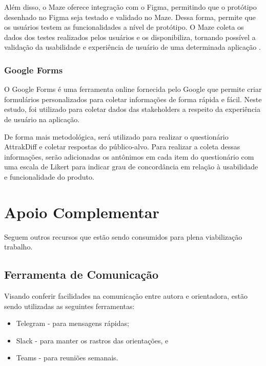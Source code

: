Além disso, o Maze oferece integração com o Figma, permitindo que o protótipo desenhado no Figma seja testado e validado no Maze. Dessa forma, permite que os usuários 
testem as funcionalidades a nível de protótipo. O Maze coleta os dados dos testes realizados pelos usuários e os disponibiliza, tornando possível a validação da usabilidade 
e experiência de usuário de uma determinada aplicação \cite{maze}.

\subsubsection{Google Forms}
\label{sec:Google Forms}
O Google Forms \cite{googleforms} é uma ferramenta online fornecida pelo Google que permite criar formulários personalizados para coletar informações de forma rápida e fácil. Neste estudo, foi 
utilizado para coletar dados das stakeholders a respeito da experiência de usuário na aplicação.

De forma mais metodológica, será utilizado para realizar o questionário AttrakDiff e coletar respostas do público-alvo. Para realizar a coleta dessas informações, serão adicionadas 
os antônimos em cada item do questionário com uma escala de Likert para indicar grau de concordância em relação à usabilidade e funcionalidade do produto.

\section{Apoio Complementar}
\label{sec:Apoio Complementar}
Seguem outros recursos que estão sendo consumidos para plena viabilização trabalho.

\subsection{Ferramenta de Comunicação}
\label{sec:Ferramenta de Comunicação}

\begin{description}
    \item Visando conferir facilidades na comunicação entre autora e orientadora, estão sendo utilizadas as seguintes ferramentas:
          \begin{itemize}
              \item Telegram - para mensagens rápidas;

              \item Slack - para manter os rastros das orientações, e

              \item Teams - para reuniões semanais.
          \end{itemize}
\end{description}

